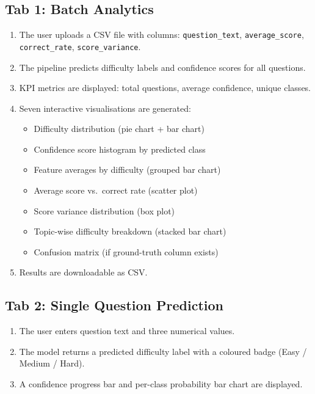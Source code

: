 \documentclass[12pt, a4paper, twoside]{article}
\newcommand{\code}[1]{\texttt{#1}}
\begin{document}
\subsection{Tab 1: Batch Analytics}

\begin{enumerate}[leftmargin=2em]
    \item The user uploads a CSV file with columns:
          \code{question\_text}, \code{average\_score},
          \code{correct\_rate}, \code{score\_variance}.
    \item The pipeline predicts difficulty labels and confidence
          scores for all questions.
    \item KPI metrics are displayed: total questions, average
          confidence, unique classes.
    \item Seven interactive visualisations are generated:
    \begin{itemize}
        \item Difficulty distribution (pie chart + bar chart)
        \item Confidence score histogram by predicted class
        \item Feature averages by difficulty (grouped bar chart)
        \item Average score vs.\ correct rate (scatter plot)
        \item Score variance distribution (box plot)
        \item Topic-wise difficulty breakdown (stacked bar chart)
        \item Confusion matrix (if ground-truth column exists)
    \end{itemize}
    \item Results are downloadable as CSV.
\end{enumerate}

\subsection{Tab 2: Single Question Prediction}

\begin{enumerate}[leftmargin=2em]
    \item The user enters question text and three numerical values.
    \item The model returns a predicted difficulty label with a
          coloured badge (\textcolor{easygreen}{Easy} /
          \textcolor{medamber}{Medium} /
          \textcolor{hardred}{Hard}).
    \item A confidence progress bar and per-class probability bar
          chart are displayed.
\end{enumerate}
\end{document}
